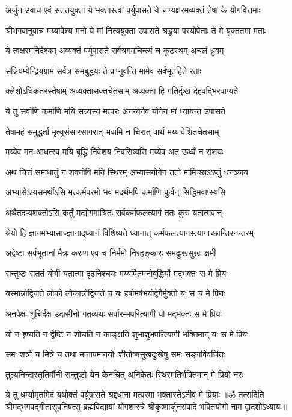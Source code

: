{अर्जुन उवाच}
\twolineshloka
{एवं सततयुक्ता ये भक्तास्त्वां पर्युपासते}
{ये चाप्यक्षरमव्यक्तं तेषां के योगवित्तमाः}%

\clearpage
{श्रीभगवानुवाच}
\twolineshloka
{मय्यावेश्य मनो ये मां नित्ययुक्ता उपासते}
{श्रद्धया परयोपेताः ते मे युक्ततमा मताः}%

\twolineshloka
{ये त्वक्षरमनिर्देश्यम् अव्यक्तं पर्युपासते}
{सर्वत्रगमचिन्त्यं च कूटस्थम् अचलं ध्रुवम्}%

\twolineshloka
{सन्नियम्येन्द्रियग्रामं सर्वत्र समबुद्धयः}
{ते प्राप्नुवन्ति मामेव सर्वभूतहिते रताः}%

\twolineshloka
{क्लेशोऽधिकतरस्तेषाम् अव्यक्तासक्तचेतसाम्}%
{अव्यक्ता हि गतिर्दुःखं देहवद्भिरवाप्यते}%

\twolineshloka
{ये तु सर्वाणि कर्माणि मयि सन्न्यस्य मत्परः}
{अनन्येनैव योगेन मां ध्यायन्त उपासते}%

\twolineshloka
{तेषामहं समुद्धर्ता मृत्युसंसारसागरात्}
{भवामि न चिरात् पार्थ मय्यावेशितचेतसाम्}%

\twolineshloka
{मय्येव मन आधत्स्व मयि बुद्धिं निवेशय}
{निवसिष्यसि मय्येव अत ऊर्ध्वं न संशयः}%

\twolineshloka
{अथ चित्तं समाधातुं न शक्नोषि मयि स्थिरम्}
{अभ्यासयोगेन ततो मामिच्छाऽऽप्तुं धनञ्जय}%

\twolineshloka
{अभ्यासेऽप्यसमर्थोऽसि मत्कर्मपरमो भव}
{मदर्थमपि कर्माणि कुर्वन् सिद्धिमवाप्स्यसि}%

\twolineshloka
{अथैतदप्यशक्तोऽसि कर्तुं मद्योगमाश्रितः}
{सर्वकर्मफलत्यागं ततः कुरु यतात्मवान्}%

\twolineshloka
{श्रेयो हि ज्ञानमभ्यासाज्ज्ञानाद्‌ध्यानं विशिष्यते}
{ध्यानात् कर्मफलत्यागस्त्यागाच्छान्तिरनन्तरम्}%

\twolineshloka
{अद्वेष्टा सर्वभूतानां मैत्रः करुण एव च}
{निर्ममो निरहङ्कारः समदुःखसुखः क्षमी}%

\twolineshloka
{सन्तुष्टः सततं योगी यतात्मा दृढनिश्चयः}
{मय्यर्पितमनोबुद्धिर्यो मद्भक्तः स मे प्रियः}%

\twolineshloka
{यस्मान्नोद्विजते लोको लोकान्नोद्विजते च यः}
{हर्षामर्षभयोद्वेगैर्मुक्तो यः स च मे प्रियः}%

\twolineshloka
{अनपेक्षः शुचिर्दक्ष उदासीनो गतव्यथः}
{सर्वारम्भपरित्यागी यो मद्भक्तः स मे प्रियः}%

\twolineshloka
{यो न हृष्यति न द्वेष्टि न शोचति न काङ्क्षति}
{शुभाशुभपरित्यागी भक्तिमान् यः स मे प्रियः}%

\twolineshloka
{समः शत्रौ च मित्रे च तथा मानापमानयोः}
{शीतोष्णसुखदुःखेषु समः सङ्गविवर्जितः}%

\twolineshloka
{तुल्यनिन्दास्तुतिर्मौनी सन्तुष्टो येन केनचित्}
{अनिकेतः स्थिरमतिर्भक्तिमान् मे प्रियो नरः}%

\twolineshloka
{ये तु धर्म्यामृतमिदं यथोक्तं पर्युपासते}
{श्रद्दधाना मत्परमा भक्तास्तेऽतीव मे प्रियाः}%
{॥ॐ तत्सदिति श्रीमद्भगवद्गीतासूपनिषत्सु ब्रह्मविद्यायां योगशास्त्रे श्रीकृष्णार्जुनसंवादे भक्तियोगो नाम द्वादशोऽध्यायः॥}